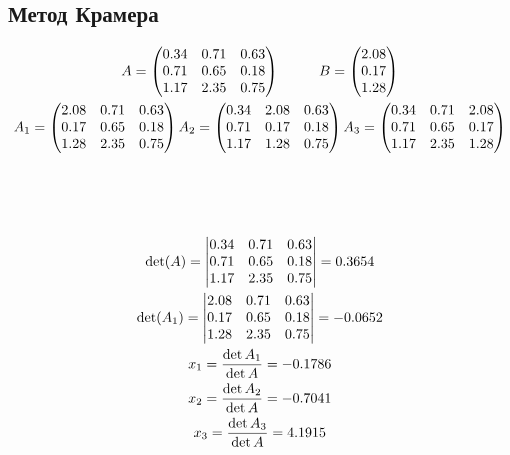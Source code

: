 \documentclass{article}
\begin{document}
\begin{large}
		\subsection*{Метод Крамера}
		\begin{gather}\nonumber
			A=\begin{pmatrix}
				0.34 & 0.71 & 0.63\\
				0.71 & 0.65 & 0.18\\
				1.17 & 2.35 & 0.75
			\end{pmatrix}
			\hspace{28pt}
			B=\begin{pmatrix}
				2.08\\
				0.17\\
				1.28
			\end{pmatrix}
			\\\nonumber
			A_1=\begin{pmatrix}
				2.08 & 0.71 & 0.63\\
				0.17 & 0.65 & 0.18\\
				1.28 & 2.35 & 0.75
			\end{pmatrix}
			\vspace{28pt}
			A_2=\begin{pmatrix}
				0.34 & 2.08 & 0.63\\
				0.71 & 0.17 & 0.18\\
				1.17 & 1.28 & 0.75
			\end{pmatrix}
			\vspace{28pt}
			A_3=\begin{pmatrix}
				0.34 & 0.71 & 2.08\\
				0.71 & 0.65 & 0.17\\
				1.17 & 2.35 & 1.28
			\end{pmatrix}
			\\
			\det(A)=\begin{vmatrix}\nonumber
				0.34 & 0.71 & 0.63\\
				0.71 & 0.65 & 0.18\\
				1.17 & 2.35 & 0.75
			\end{vmatrix} = 0.3654
			\\
			\det(A_1)=\begin{vmatrix}\nonumber
				2.08 & 0.71 & 0.63\\
				0.17 & 0.65 & 0.18\\
				1.28 & 2.35 & 0.75
			\end{vmatrix} = -0.0652
			\\\nonumber
			x_1 = \frac{\det{A_1}}{\det{A}}	= -0.1786\\\nonumber	
			x_2 = \frac{\det{A_2}}{\det{A}}	= -0.7041\\\nonumber
			x_3 = \frac{\det{A_3}}{\det{A}}	= 4.1915\\\nonumber
		\end{gather}


\end{large}
\end{document}
